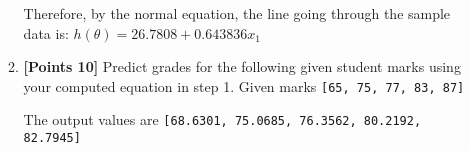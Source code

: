 \documentclass[12pt]{article}
\begin{document}
\begin{enumerate}
\begin{enumerate}
                    Therefore, by the normal equation, the line going through
                    the sample data is:
                    $h(\theta) = 26.7808 + 0.643836 x_1$

              \item \textbf{[Points 10]} Predict grades for the following given student marks using your
                    computed equation in step 1.
                    Given marks \verb/[65, 75, 77, 83, 87]/

                    The output values are \verb/[68.6301, 75.0685, 76.3562, 80.2192, 82.7945]/
          \end{enumerate}
\end{enumerate}
\end{document}
